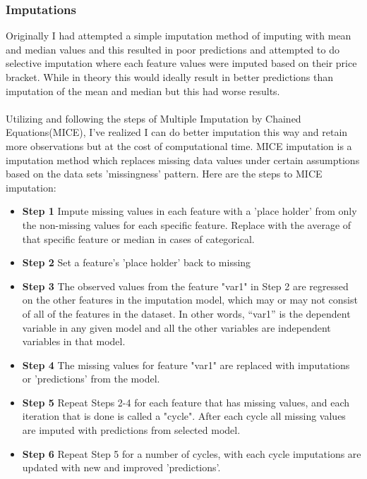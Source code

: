 \documentclass{article}
\begin{document}
\begin{titlepage}
\subsubsection{Imputations}
    Originally I had attempted a simple imputation method of imputing with mean and median values and this resulted in poor predictions and attempted to do selective imputation where each feature values were imputed based on their price bracket. While in theory this would ideally result in better predictions than imputation of the mean and median but this had worse results. \\
    \\
    Utilizing and following the steps of Multiple Imputation by Chained Equations(MICE), I've realized I can do better imputation this way and retain more observations but at the cost of computational time. MICE imputation is a imputation method which replaces missing data values under certain assumptions based on the data sets 'missingness' pattern. Here are the steps to MICE imputation:
    
    \begin{itemize}
        \item \textbf{Step 1} Impute missing values in each feature with a 'place holder' from only the non-missing values for each specific feature. Replace with the average of that specific feature or median in cases of categorical. 
        \item \textbf{Step 2} Set a feature's 'place holder' back to missing
        \item \textbf{Step 3} The observed values from the feature "var1" in Step 2 are regressed on the other features in the imputation model, which may or may not consist of all of the features in the dataset. In other words, “var1” is the dependent variable in any given model and all the other variables are independent variables in that  model.
        \item \textbf{Step 4} The missing values for feature "var1" are replaced with imputations or 'predictions' from the model.
        \item \textbf{Step 5} Repeat Steps 2-4 for each feature that has missing values, and each iteration that is done is called a "cycle". After each cycle all missing values are imputed with predictions from selected model.
        \item \textbf{Step 6} Repeat Step 5 for a number of cycles, with each cycle imputations are updated with new and improved 'predictions'. 
    \end{itemize}
    

\end{titlepage}
\end{document}
